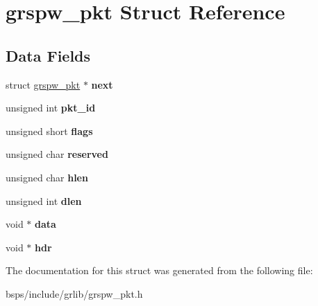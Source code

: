 \hypertarget{structgrspw__pkt}{}\section{grspw\+\_\+pkt Struct Reference}
\label{structgrspw__pkt}
\subsection*{Data Fields}
\begin{DoxyCompactItemize}
\item 
\mbox{\label{structgrspw__pkt_a92eaf2233f83baee26ec446919707559}} 
struct \mbox{\hyperlink{structgrspw__pkt}{grspw\+\_\+pkt}} $\ast$ {\bfseries next}
\item 
\mbox{\label{structgrspw__pkt_a30eaa10ce7a4a88fb721f8bee257c1dc}} 
unsigned int {\bfseries pkt\+\_\+id}
\item 
\mbox{\label{structgrspw__pkt_a0dc0b38420ca252c4edd33314d9adcc1}} 
unsigned short {\bfseries flags}
\item 
\mbox{\label{structgrspw__pkt_a456a879cd55eb65cc3aa504852eb72b0}} 
unsigned char {\bfseries reserved}
\item 
\mbox{\label{structgrspw__pkt_a00df0748852fc7eb73b3705b89f14a75}} 
unsigned char {\bfseries hlen}
\item 
\mbox{\label{structgrspw__pkt_ae2f79c4b3e84e587ef82b1cbad3469f1}} 
unsigned int {\bfseries dlen}
\item 
\mbox{\label{structgrspw__pkt_aad58a5ed126269d084b9f5aa037ff68d}} 
void $\ast$ {\bfseries data}
\item 
\mbox{\label{structgrspw__pkt_abddba5395af9bcb0e9b074d4047a659e}} 
void $\ast$ {\bfseries hdr}
\end{DoxyCompactItemize}


The documentation for this struct was generated from the following file\+:\begin{DoxyCompactItemize}
\item 
bsps/include/grlib/grspw\+\_\+pkt.\+h\end{DoxyCompactItemize}
